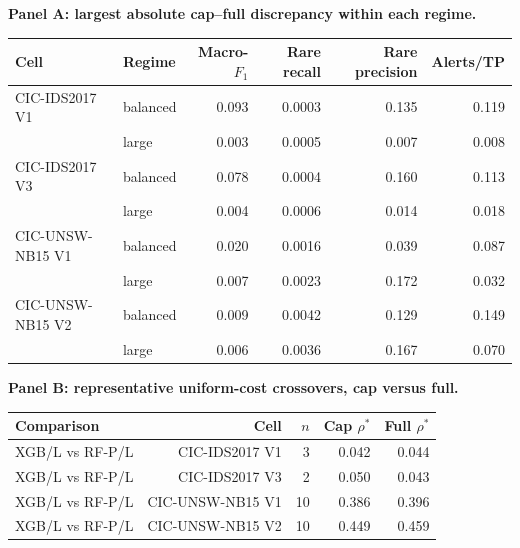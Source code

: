 \begin{minipage}{\linewidth}
\centering
\textbf{Panel A: largest absolute cap--full discrepancy within each regime.}\\[2pt]
\begin{tabular}{@{}llrrrr@{}}
\toprule
Cell & Regime & Macro-$F_1$ & Rare recall & Rare precision & Alerts/TP \\
\midrule
CIC-IDS2017 V1 & balanced & 0.093 & 0.0003 & 0.135 & 0.119 \\
 & large & 0.003 & 0.0005 & 0.007 & 0.008 \\
CIC-IDS2017 V3 & balanced & 0.078 & 0.0004 & 0.160 & 0.113 \\
 & large & 0.004 & 0.0006 & 0.014 & 0.018 \\
CIC-UNSW-NB15 V1 & balanced & 0.020 & 0.0016 & 0.039 & 0.087 \\
 & large & 0.007 & 0.0023 & 0.172 & 0.032 \\
CIC-UNSW-NB15 V2 & balanced & 0.009 & 0.0042 & 0.129 & 0.149 \\
 & large & 0.006 & 0.0036 & 0.167 & 0.070 \\
\bottomrule
\end{tabular}
\par\medskip
\textbf{Panel B: representative uniform-cost crossovers, cap versus full.}\\[2pt]
\begin{tabular}{@{}lrrrr@{}}
\toprule
Comparison & Cell & $n$ & Cap $\rho^*$ & Full $\rho^*$ \\
\midrule
XGB/L vs RF-P/L & CIC-IDS2017 V1 & 3 & 0.042 & 0.044 \\
XGB/L vs RF-P/L & CIC-IDS2017 V3 & 2 & 0.050 & 0.043 \\
XGB/L vs RF-P/L & CIC-UNSW-NB15 V1 & 10 & 0.386 & 0.396 \\
XGB/L vs RF-P/L & CIC-UNSW-NB15 V2 & 10 & 0.449 & 0.459 \\
\bottomrule
\end{tabular}
\end{minipage}
